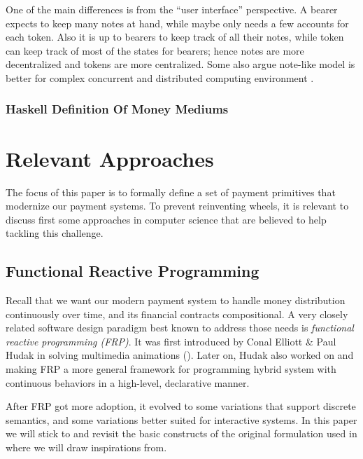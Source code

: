 One of the main differences is from the ``user interface'' perspective. A bearer expects to keep
many notes at hand, while maybe only needs a few accounts for each token. Also it is up to bearers
to keep track of all their notes, while token can keep track of most of the states for bearers;
hence notes are more decentralized and tokens are more centralized. Some also argue note-like model
is better for complex concurrent and distributed computing environment
.

\subsubsection{Haskell Definition Of Money Mediums}



\section{Relevant Approaches}

The focus of this paper is to formally define a set of payment primitives that modernize our payment
systems. To prevent reinventing wheels, it is relevant to discuss first some approaches in computer
science that are believed to help tackling this challenge.

\subsection{Functional Reactive Programming}

Recall that we want our modern payment system to handle money distribution continuously over time,
and its financial contracts compositional. A very closely related software design paradigm best
known to address those needs is \textit{functional reactive programming (FRP)}.  It was first
introduced by Conal Elliott \& Paul Hudak in solving multimedia animations
(\cite{elliott1997functional}). Later on, Hudak also worked on \cite{hudak2002arrows} and
\cite{wan2000functional} making FRP a more general framework for programming hybrid system with
continuous behaviors in a high-level, declarative manner.

After FRP got more adoption, it evolved to some variations that support discrete semantics, and some
variations better suited for interactive systems. In this paper we will stick to and revisit the
basic constructs of the original formulation used in \cite{elliott1997functional} where we will draw
inspirations from.

